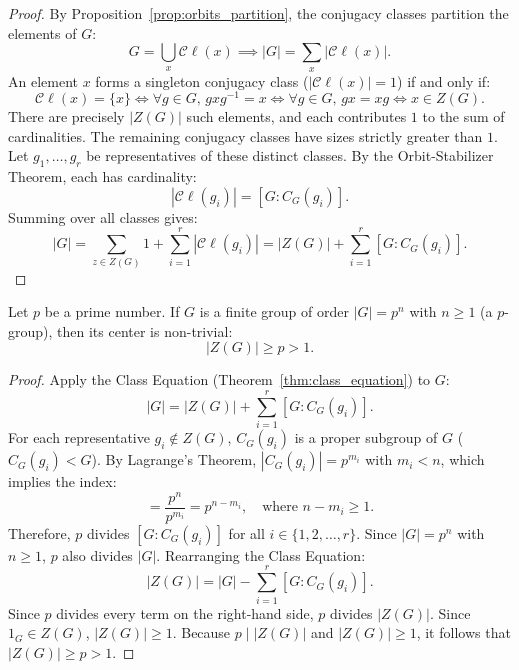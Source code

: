 \begin{proof}
By Proposition~\ref{prop:orbits_partition}, the conjugacy classes partition the elements of $G$:
\begin{equation*}
G = \bigcup_{x} \mathcal{C}\ell(x) \implies |G| = \sum_{x} |\mathcal{C}\ell(x)|.
\end{equation*}
An element $x$ forms a singleton conjugacy class ($|\mathcal{C}\ell(x)| = 1$) if and only if:
\begin{equation*}
\mathcal{C}\ell(x) = \{x\} \iff \forall g \in G, \, gxg^{-1} = x \iff \forall g \in G, \, gx = xg \iff x \in Z(G).
\end{equation*}
There are precisely $|Z(G)|$ such elements, and each contributes $1$ to the sum of cardinalities.
The remaining conjugacy classes have sizes strictly greater than $1$. Let $g_1, \dots, g_r$ be representatives of these distinct classes.
By the Orbit-Stabilizer Theorem, each has cardinality:
\begin{equation*}
|\mathcal{C}\ell(g_i)| = [G : C_G(g_i)].
\end{equation*}
Summing over all classes gives:
\begin{equation*}
|G| = \sum_{z \in Z(G)} 1 + \sum_{i=1}^r |\mathcal{C}\ell(g_i)| = |Z(G)| + \sum_{i=1}^r [G : C_G(g_i)].
\end{equation*}
\end{proof}

\begin{theorem}
\label{thm:pgroup_center}
Let $p$ be a prime number. If $G$ is a finite group of order $|G| = p^n$ with $n \ge 1$ (a $p$-group), then its center is non-trivial:
\begin{equation}
|Z(G)| \ge p > 1.
\end{equation}
\end{theorem}

\begin{proof}
Apply the Class Equation (Theorem~\ref{thm:class_equation}) to $G$:
\begin{equation*}
|G| = |Z(G)| + \sum_{i=1}^r [G : C_G(g_i)].
\end{equation*}
For each representative $g_i \notin Z(G)$, $C_G(g_i)$ is a proper subgroup of $G$ ($C_G(g_i) < G$).
By Lagrange's Theorem, $|C_G(g_i)| = p^{m_i}$ with $m_i < n$, which implies the index:
\begin{equation*}
[G : C_G(g_i)] = \frac{p^n}{p^{m_i}} = p^{n - m_i}, \quad \text{where } n - m_i \ge 1.
\end{equation*}
Therefore, $p$ divides $[G : C_G(g_i)]$ for all $i \in \{1, 2, \dots, r\}$.
Since $|G| = p^n$ with $n \ge 1$, $p$ also divides $|G|$.
Rearranging the Class Equation:
\begin{equation*}
|Z(G)| = |G| - \sum_{i=1}^r [G : C_G(g_i)].
\end{equation*}
Since $p$ divides every term on the right-hand side, $p$ divides $|Z(G)|$.
Since $1_G \in Z(G)$, $|Z(G)| \ge 1$.
Because $p \mid |Z(G)|$ and $|Z(G)| \ge 1$, it follows that $|Z(G)| \ge p > 1$.
\end{proof}

